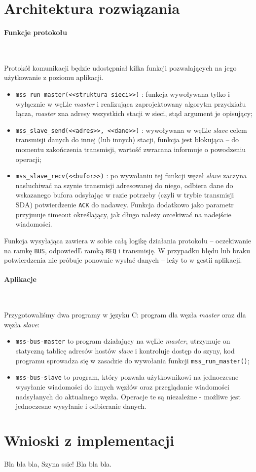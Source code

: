 \documentclass[a4paper,12pt]{article}
\begin{document}
\section{Architektura rozwiązania}

\paragraph{Funkcje protokołu}\

Protokół komunikacji będzie udostępniał kilka funkcji pozwalających na jego
użytkowanie z poziomu aplikacji.
\begin{itemize}
  \item \texttt{mss\_run\_master(\textnormal{<<struktura sieci>>})} : funkcja
        wywoływana tylko i wyłącznie w węĽle \emph{master} i realizująca
        zaprojektowany algorytm przydziału łącza, \emph{master} zna adresy
        wszystkich stacji w sieci, stąd argument je opisujący;
  \item \texttt{mss\_slave\_send(\textnormal{<<adres>>}, \textnormal{<<dane>>})}
        : wywoływana w węĽle \emph{slave} celem transmisji danych do innej
        (lub innych) stacji, funkcja jest blokująca -- do momentu zakończenia
        transmisji, wartość zwracana informuje o powodzeniu operacji;
  \item \texttt{mss\_slave\_recv(\textnormal{<<bufor>>})} : po wywołaniu tej
        funkcji węzeł \emph{slave} zaczyna nasłuchiwać na szynie transmisji
        adresowanej do niego, odbiera dane do wskazanego bufora odsyłając
        w razie potrzeby (czyli w trybie transmisji SDA) potwierdzenie
        \texttt{ACK} do nadawcy. Funkcja dodatkowo jako parametr przyjmuje
        timeout określający, jak długo należy ozcekiwać na nadejście
        wiadomości.
\end{itemize}
Funkcja wysyłająca zawiera w sobie całą logikę działania protokołu --
oczekiwanie na ramkę \texttt{BUS}, odpowiedĽ ramką \texttt{REQ} i transmisję.
W przypadku błędu lub braku potwierdzenia nie próbuje ponownie wysłać danych
-- leży to w gestii aplikacji.

\paragraph{Aplikacje}\

Przygotowaliśmy dwa programy w języku C: program dla węzła \emph{master}
oraz dla węzła \emph{slave}:
\begin{itemize}
    \item \texttt{mss-bus-master} to program działający na węĽle
          \emph{master}, utrzymuje on statyczną tablicę adresów hostów
          \emph{slave} i kontroluje dostęp do szyny, kod programu sprowadza
          się w zasadzie do wywołania funkcji \texttt{mss\_run\_master()};
    \item \texttt{mss-bus-slave} to program, który pozwala użytkownikowi
          na jednoczesne wysyłanie wiadomości do innych węzłów oraz
          przeglądanie wiadomości nadsyłanych do aktualnego węzła. Operacje
          te są niezależne - możliwe jest jednoczesne wysyłanie i odbieranie
          danych.
\end{itemize}

\section{Wnioski z implementacji}

Bla bla bla, Szyna ssie! Bla bla bla.
\end{document}
